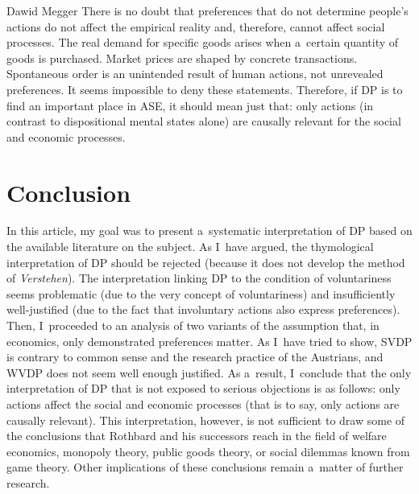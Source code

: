 \begin{artengenv}{Dawid Megger}
There is no doubt that preferences that do not determine people's actions do not affect the empirical reality and, therefore, cannot affect social processes. The real demand for specific goods arises when a~certain quantity of goods is purchased. Market prices are shaped by concrete transactions. Spontaneous order is an unintended result of human actions, not unrevealed preferences. It seems impossible to deny these statements. Therefore, if DP is to find an important place in ASE, it should mean just that: only actions (in contrast to dispositional mental states alone) are causally relevant for the social and economic processes.



\section{Conclusion}

In this article, my goal was to present a~systematic interpretation of DP based on the available literature on the subject. As I~have argued, the thymological interpretation of DP should be rejected (because it does not develop the method of \textit{Verstehen}). The interpretation linking DP to the condition of voluntariness seems problematic (due to the very concept of voluntariness) and insufficiently well-justified (due to the fact that involuntary actions also express preferences). Then, I~proceeded to an analysis of two variants of the assumption that, in economics, only demonstrated preferences matter. As I~have tried to show, SVDP is contrary to common sense and the research practice of the Austrians, and WVDP does not seem well enough justified. As a~result, I~conclude that the only interpretation of DP that is not exposed to serious objections is as follows: only actions affect the social and economic processes (that is to say, only actions are causally relevant). This interpretation, however, is not sufficient to draw some of the conclusions that Rothbard and his successors reach in the field of welfare economics, monopoly theory, public goods theory, or social dilemmas known from game theory. Other implications of these conclusions remain a~matter of further research.



\end{artengenv}


